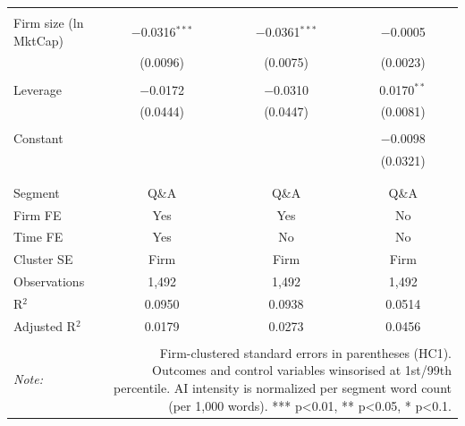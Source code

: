 \begin{table}[!htbp]
\begin{tabular}{@{\extracolsep{5pt}}lccc}
  & & & \\ 
 Firm size (ln MktCap) & $-$0.0316$^{***}$ & $-$0.0361$^{***}$ & $-$0.0005 \\ 
  & (0.0096) & (0.0075) & (0.0023) \\ 
  & & & \\ 
 Leverage & $-$0.0172 & $-$0.0310 & 0.0170$^{**}$ \\ 
  & (0.0444) & (0.0447) & (0.0081) \\ 
  & & & \\ 
 Constant &  &  & $-$0.0098 \\ 
  &  &  & (0.0321) \\ 
  & & & \\ 
\hline \\[-1.8ex] 
Segment & Q\&A & Q\&A & Q\&A \\ 
Firm FE & Yes & Yes & No \\ 
Time FE & Yes & No & No \\ 
Cluster SE & Firm & Firm & Firm \\ 
Observations & 1,492 & 1,492 & 1,492 \\ 
R$^{2}$ & 0.0950 & 0.0938 & 0.0514 \\ 
Adjusted R$^{2}$ & 0.0179 & 0.0273 & 0.0456 \\ 
\hline 
\hline \\[-1.8ex] 
\textit{Note:}  & \multicolumn{3}{r}{Firm-clustered standard errors in parentheses (HC1). Outcomes and control variables winsorised at 1st/99th percentile. AI intensity is normalized per segment word count (per 1,000 words). *** p<0.01, ** p<0.05, * p<0.1.} \\ 
\end{tabular} 
\end{table} 
